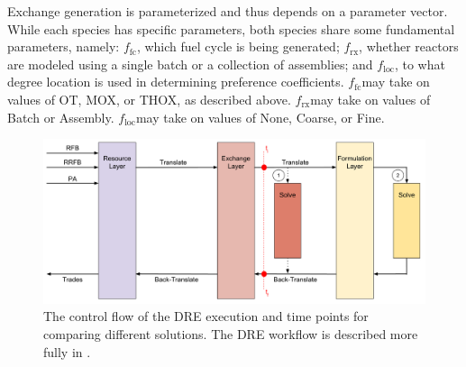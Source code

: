 \documentclass{anstrans}
\newcommand{\ffc}{$f_{\text{fc}}$}
\newcommand{\frx}{$f_{\text{rx}}$}
\newcommand{\floc}{$f_{\text{loc}}$}
\begin{document}
Exchange generation is parameterized and thus depends on a parameter
vector. While each species has specific parameters, both species share some
fundamental parameters, namely: \ffc, which fuel cycle is being generated; \frx,
whether reactors are modeled using a single batch or a collection of assemblies;
and \floc, to what degree location is used in determining preference
coefficients. \ffc may take on values of OT, MOX, or THOX, as described
above. \frx may take on values of Batch or Assembly. \floc may take on values of
None, Coarse, or Fine.


\begin{figure}
  \begin{center}
    \includegraphics[width=2\columnwidth]{exchange_xlation_timing.pdf}
    \caption[]{
      \label{fig:dre_time}
      The control flow of the DRE execution and time points for comparing 
      different solutions. The DRE workflow is described more fully in 
      \cite{gidden_agent-based_2013, gidden_agent-based_2014}. }
  \end{center}
\end{figure}
\end{document}

